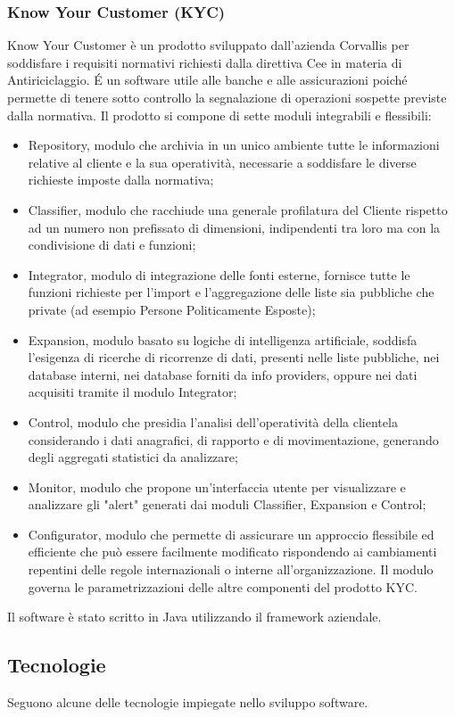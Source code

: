 \subsubsection{Know Your Customer (KYC)}
\label{1.2.5}
Know Your Customer è un prodotto sviluppato dall'azienda Corvallis per soddisfare i requisiti normativi richiesti dalla direttiva Cee in materia di Antiriciclaggio. \'{E} un software utile alle banche e alle assicurazioni poiché permette di tenere sotto controllo la segnalazione di operazioni sospette previste dalla normativa. Il prodotto si compone di sette moduli integrabili e flessibili:
\begin{itemize}
\item Repository, modulo che archivia in un unico ambiente tutte le informazioni relative al cliente e la sua operatività, necessarie a soddisfare le diverse richieste imposte dalla normativa;
\item Classifier, modulo che racchiude una generale profilatura del Cliente rispetto ad un numero non prefissato di dimensioni, indipendenti tra loro ma con la condivisione di dati e funzioni;
\item Integrator, modulo di integrazione delle fonti esterne, fornisce tutte le funzioni richieste per l'import e l'aggregazione delle liste sia pubbliche che private (ad esempio Persone Politicamente Esposte);
\item Expansion, modulo basato su logiche di intelligenza artificiale, soddisfa l'esigenza di ricerche di ricorrenze di dati, presenti nelle liste pubbliche, nei database interni, nei database forniti da info providers, oppure nei dati acquisiti tramite il modulo Integrator;
\item Control, modulo che presidia l'analisi dell'operatività della clientela considerando i dati anagrafici, di rapporto e di movimentazione, generando degli aggregati statistici da analizzare;
\item Monitor, modulo che  propone un'interfaccia utente per visualizzare e analizzare gli "alert" generati dai moduli Classifier, Expansion e Control;
\item Configurator, modulo che permette di assicurare un approccio flessibile ed efficiente che può essere facilmente modificato rispondendo ai cambiamenti repentini delle regole internazionali o interne all'organizzazione. Il modulo governa le parametrizzazioni delle altre componenti del prodotto KYC.
\end{itemize}
Il software è stato scritto in Java utilizzando il framework aziendale.
\subsection{Tecnologie}
\label{1.3}
Seguono alcune delle tecnologie impiegate nello sviluppo software.

